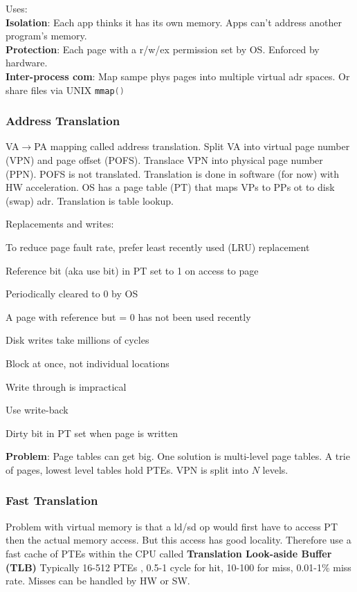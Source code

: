 \documentclass[a4paper, fontsize=8pt, landscape, DIV=1]{scrartcl}
\makeatletter
\renewenvironment{outline}[1][]{%
  \ifthenelse{\equal{#1}{}}{}{\renewcommand{\ol@type}{#1}}%
  \ol@z%
  \newcommand{\0}{\ol@toz\ol@z}%
  \newcommand{\1}{\vspace{\dimexpr\outlinespacingscalar\baselineskip-\baselineskip}\ol@toi\ol@i\item}%
  \newcommand{\2}{\vspace{\dimexpr\outlinespacingscalartwo\baselineskip-\baselineskip}\ol@toii\ol@ii\item}%
  \newcommand{\3}{\vspace{\dimexpr\outlinespacingscalar\baselineskip-\baselineskip}\ol@toiii\ol@iii\item}%
  \newcommand{\4}{\vspace{\dimexpr\outlinespacingscalar\baselineskip-\baselineskip}\ol@toiiii\ol@iiii\item}%
}{%
  \ol@toz\ol@exit%
}
\def\outlinespacingscalar{0.5}
\def\outlinespacingscalartwo{0.5}
\makeatother
\begin{document}
\begin{multicols*}{4}
  Uses: \\
  \textbf{Isolation}: Each app thinks it has its own memory. Apps can't address another program's
  memory.\\
  \textbf{Protection}: Each page with a r/w/ex permission set by OS. Enforced by hardware.\\
  \textbf{Inter-process com}: Map sampe phys pages into multiple virtual adr spaces. Or share files
  via UNIX \lstinline[language=C]!mmap()!

  \subsubsection{Address Translation}
  VA$\to$PA mapping called address translation. Split VA into virtual page number (VPN) and
  page offset (POFS). Translace VPN into physical page number (PPN). POFS is not translated.
  Translation is done in software (for now) with HW acceleration. OS has a page table (PT)
  that maps VPs to PPs ot to disk (swap) adr. Translation is table lookup.

  Replacements and writes:
  \begin{outline}
    \1 To reduce page fault rate, prefer least recently used (LRU) replacement
      \2 Reference bit (aka use bit) in PT set to 1 on access to page
      \2 Periodically cleared to 0 by OS
      \2 A page with reference but = 0 has not been used recently
    \1 Disk writes take millions of cycles
      \2 Block at once, not individual locations
      \2 Write through is impractical
      \2 Use write-back
      \2 Dirty bit in PT set when page is written
  \end{outline}

  \textbf{Problem}: Page tables can get big. One solution is multi-level page tables. A 
  trie of pages, lowest level tables hold PTEs. VPN is split into $N$ levels.

  \subsubsection{Fast Translation}
  Problem with virtual memory is that a ld/sd op would first have to access PT then
  the actual memory access. But this access has good locality. Therefore use a fast
  cache of PTEs within the CPU called \textbf{Translation Look-aside Buffer (TLB)}
  Typically 16-512 PTEs , 0.5-1 cycle for hit, 10-100 for miss, 0.01-1\% miss rate.
  Misses can be handled by HW or SW.


\end{multicols*}
\end{document}
